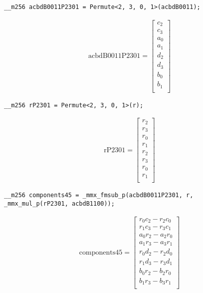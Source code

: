 \begin{verbatim}
__m256 acbdB0011P2301 = Permute<2, 3, 0, 1>(acbdB0011);
\end{verbatim} 
\begin{align*}
\mathrm{acbdB0011P2301} 
=
\begin{bmatrix}
c_2\\
c_3\\
a_0\\
a_1\\
d_2\\
d_3\\
b_0\\
b_1\\
\end{bmatrix}
\end{align*}


\begin{verbatim}
__m256 rP2301 = Permute<2, 3, 0, 1>(r);
\end{verbatim} 
\begin{align*}
\mathrm{rP2301} 
=
\begin{bmatrix}
r_2\\
r_3\\
r_0\\
r_1\\
r_2\\
r_3\\
r_0\\
r_1\\
\end{bmatrix}
\end{align*}

\begin{verbatim}
__m256 components45 = _mmx_fmsub_p(acbdB0011P2301, r, _mmx_mul_p(rP2301, acbdB1100));
\end{verbatim} 
\begin{align*}
\mathrm{components45} 
=
\begin{bmatrix}
r_0c_2 - r_2c_0\\
r_1c_3 - r_3c_1\\
a_0r_2 - a_2r_0\\
a_1r_3 - a_3r_1\\
r_0d_2 - r_2d_0\\
r_1d_3 - r_3d_1\\
b_0r_2 - b_2r_0\\
b_1r_3 - b_3r_1\\
\end{bmatrix}
\end{align*}


